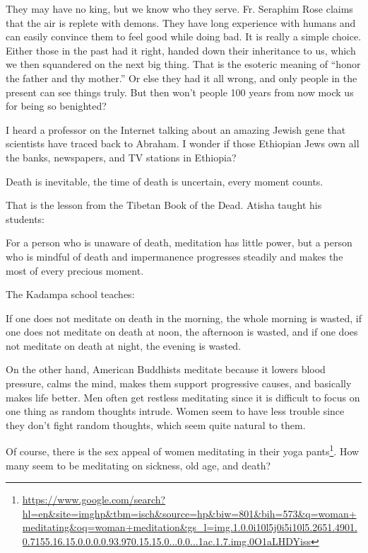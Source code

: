 They may have no king, but we know who they serve. Fr. Seraphim Rose claims that the air is replete with demons. They have long experience with humans and can easily convince them to feel good while doing bad. It is really a simple choice. Either those in the past had it right, handed down their inheritance to us, which we then squandered on the next big thing. That is the esoteric meaning of ``honor the father and thy mother.'' Or else they had it all wrong, and only people in the present can see things truly. But then won't people 100 years from now mock us for being so benighted?

I heard a professor on the Internet talking about an amazing Jewish gene that scientists have traced back to Abraham. I wonder if those Ethiopian Jews own all the banks, newspapers, and TV stations in Ethiopia?

Death is inevitable, the time of death is uncertain, every moment counts.

That is the lesson from the Tibetan Book of the Dead. Atisha taught his students:

\begin{quotex}
For a person who is unaware of death, meditation has little power, but a person who is mindful of death and impermanence progresses steadily and makes the most of every precious moment.
\end{quotex}


The Kadampa school teaches:

\begin{quotex}
If one does not meditate on death in the morning, the whole morning is wasted, if one does not meditate on death at noon, the afternoon is wasted, and if one does not meditate on death at night, the evening is wasted.
\end{quotex}


On the other hand, American Buddhists meditate because it lowers blood pressure, calms the mind, makes them support progressive causes, and basically makes life better. Men often get restless meditating since it is difficult to focus on one thing as random thoughts intrude. Women seem to have less trouble since they don't fight random thoughts, which seem quite natural to them.

Of course, there is the sex appeal of women meditating in their yoga pants\footnote{\url{https://www.google.com/search?hl=en\&site=imghp\&tbm=isch\&source=hp\&biw=801\&bih=573\&q=woman+meditating\&oq=woman+meditation\&gs_l=img.1.0.0i10l5j0i5i10l5.2651.4901.0.7155.16.15.0.0.0.0.93.970.15.15.0...0.0...1ac.1.7.img.0O1aLHDYiss}}. How many seem to be meditating on sickness, old age, and death?

